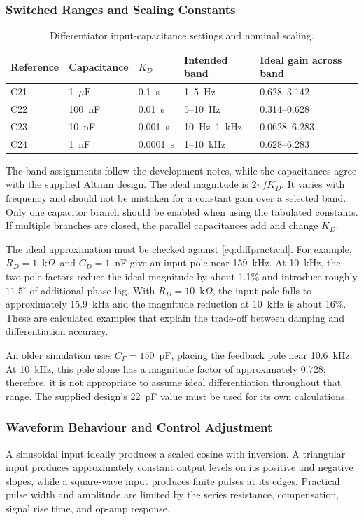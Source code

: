 \documentclass[11pt,a4paper]{article}
\newcommand{\kohm}{\ensuremath{\mathrm{k}\Omega}}
\newcommand{\uF}{\ensuremath{\mu\mathrm{F}}}
\begin{document}
\subsubsection{Switched Ranges and Scaling Constants}
\begin{table}[htbp]
\centering\small
\caption{Differentiator input-capacitance settings and nominal scaling.}
\begin{tabularx}{\textwidth}{llllY}
\toprule
\textbf{Reference} & \textbf{Capacitance} & \boldmath$K_D$ & \textbf{Intended band} & \textbf{Ideal gain across band}\\
\midrule
C21 & 1~\uF & 0.1~s & 1--5~Hz & 0.628--3.142\\
C22 & 100~nF & 0.01~s & 5--10~Hz & 0.314--0.628\\
C23 & 10~nF & 0.001~s & 10~Hz--1~kHz & 0.0628--6.283\\
C24 & 1~nF & 0.0001~s & 1--10~kHz & 0.628--6.283\\
\bottomrule
\end{tabularx}
\label{tab:diffranges}
\end{table}
The band assignments follow the development notes, while the capacitances agree with the supplied Altium design. The ideal magnitude is $2\pi fK_D$. It varies with frequency and should not be mistaken for a constant gain over a selected band. Only one capacitor branch should be enabled when using the tabulated constants. If multiple branches are closed, the parallel capacitances add and change $K_D$.

The ideal approximation must be checked against \eqref{eq:diffpractical}. For example, $R_D=1$~\kohm\ and $C_D=1$~nF give an input pole near 159~kHz. At 10~kHz, the two pole factors reduce the ideal magnitude by about 1.1\% and introduce roughly $11.5^\circ$ of additional phase lag. With $R_D=10$~\kohm, the input pole falls to approximately 15.9~kHz and the magnitude reduction at 10~kHz is about 16\%. These are calculated examples that explain the trade-off between damping and differentiation accuracy.

An older simulation uses $C_F=150$~pF, placing the feedback pole near 10.6~kHz. At 10~kHz, this pole alone has a magnitude factor of approximately 0.728; therefore, it is not appropriate to assume ideal differentiation throughout that range. The supplied design's 22~pF value must be used for its own calculations.

\subsubsection{Waveform Behaviour and Control Adjustment}
A sinusoidal input ideally produces a scaled cosine with inversion. A triangular input produces approximately constant output levels on its positive and negative slopes, while a square-wave input produces finite pulses at its edges. Practical pulse width and amplitude are limited by the series resistance, compensation, signal rise time, and op-amp response.
\end{document}
